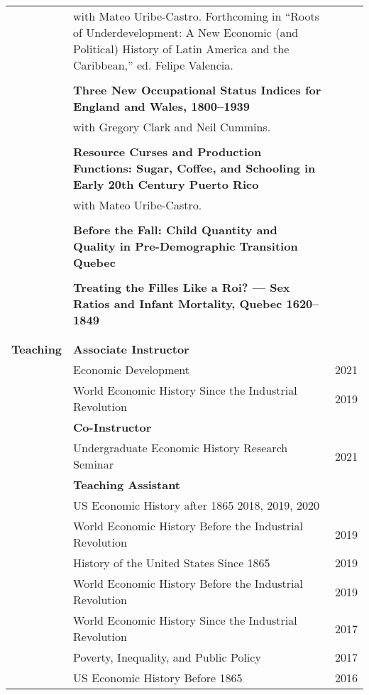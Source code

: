 \documentclass[letterpaper,11pt,oneside]{article}
\begin{document}
\begin{longtable}{@{} p{0.15\linewidth} p{0.8\linewidth} p{0.05\linewidth}}
      & with Mateo Uribe-Castro. Forthcoming in ``Roots of Underdevelopment: A New Economic (and Political) History of Latin America and the Caribbean,'' ed. Felipe Valencia. & \\
  \\
      & \textbf{Three New Occupational Status Indices for England and Wales, 1800--1939}\\ 
      &  with Gregory Clark and Neil Cummins.  &   \\
     \\
      &  \textbf{Resource Curses and Production Functions: Sugar, Coffee, and Schooling in Early 20th Century Puerto Rico} \\ 
      &  with  Mateo Uribe-Castro. \\
      \\
      &  \textbf{Before the Fall: Child Quantity and Quality in
      Pre-Demographic Transition Quebec} \\ 
      &   \\
      &  \textbf{Treating the Filles Like a Roi? --- Sex Ratios and Infant Mortality, Quebec 1620--1849} \\ 
      &   \\
      \\


     \textbf{\large{Teaching}} &  \textbf{Associate Instructor} & \\
      & Economic Development & \hfill 2021\\
     &  World Economic History Since the Industrial Revolution &\hfill 2019\\
     &   \textbf{Co-Instructor} \\
     & Undergraduate Economic History Research Seminar & \hfill  2021 \\
     & \textbf{Teaching Assistant} &\\

     &  \multicolumn{2}{l}{ US Economic History after 1865 \hfill 2018, 2019, 2020 }\\
     &  World Economic History Before the Industrial Revolution & \hfill 2019\\
     &  History of the United States Since 1865 & \hfill 2019\\
     &  World Economic History Before the Industrial Revolution & \hfill 2019\\
     &  World Economic History Since the Industrial Revolution & \hfill 2017\\
     &  Poverty, Inequality, and Public Policy & \hfill 2017\\
     &  US Economic History Before 1865 & \hfill 2016 \\


\end{longtable}
\end{document}
